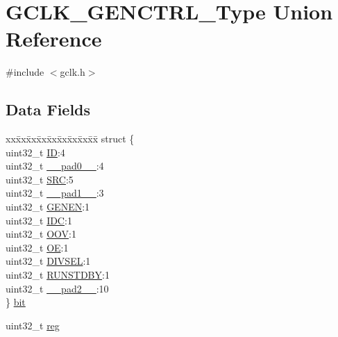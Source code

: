 \hypertarget{union_g_c_l_k___g_e_n_c_t_r_l___type}{}\section{G\+C\+L\+K\+\_\+\+G\+E\+N\+C\+T\+R\+L\+\_\+\+Type Union Reference}
\label{union_g_c_l_k___g_e_n_c_t_r_l___type}


{\ttfamily \#include $<$gclk.\+h$>$}

\subsection*{Data Fields}
\begin{DoxyCompactItemize}
\item 
\begin{tabbing}
xx\=xx\=xx\=xx\=xx\=xx\=xx\=xx\=xx\=\kill
struct \{\\
\>uint32\_t \mbox{\hyperlink{union_g_c_l_k___g_e_n_c_t_r_l___type_a505f98fde467109a9b37b3c7e008df91}{ID}}:4\\
\>uint32\_t \mbox{\hyperlink{union_g_c_l_k___g_e_n_c_t_r_l___type_a3e57c2ef1c3ffb36722f000cc1156824}{\_\_pad0\_\_}}:4\\
\>uint32\_t \mbox{\hyperlink{union_g_c_l_k___g_e_n_c_t_r_l___type_a306a1d33a25b1f2253b4b855b6e8c0d5}{SRC}}:5\\
\>uint32\_t \mbox{\hyperlink{union_g_c_l_k___g_e_n_c_t_r_l___type_a6712ba6dd1d5b43d2d56ff8ac4e275a7}{\_\_pad1\_\_}}:3\\
\>uint32\_t \mbox{\hyperlink{union_g_c_l_k___g_e_n_c_t_r_l___type_a626ef4f7972b8dfa0bb03ccbe0a5323e}{GENEN}}:1\\
\>uint32\_t \mbox{\hyperlink{union_g_c_l_k___g_e_n_c_t_r_l___type_a188040d2a2711210a32760006fecbd35}{IDC}}:1\\
\>uint32\_t \mbox{\hyperlink{union_g_c_l_k___g_e_n_c_t_r_l___type_aa77cb6d1b8627551266e155a3bf4d204}{OOV}}:1\\
\>uint32\_t \mbox{\hyperlink{union_g_c_l_k___g_e_n_c_t_r_l___type_aaabd28e260b7ff38bd76dedf0f195aba}{OE}}:1\\
\>uint32\_t \mbox{\hyperlink{union_g_c_l_k___g_e_n_c_t_r_l___type_a11c9c2929014abdf2c78a95faf49f77a}{DIVSEL}}:1\\
\>uint32\_t \mbox{\hyperlink{union_g_c_l_k___g_e_n_c_t_r_l___type_a5656560aef3eaf5aac89b68b9fe39c3a}{RUNSTDBY}}:1\\
\>uint32\_t \mbox{\hyperlink{union_g_c_l_k___g_e_n_c_t_r_l___type_a9ce12a63de64ef64ae2d59d128251cae}{\_\_pad2\_\_}}:10\\
\} \mbox{\hyperlink{union_g_c_l_k___g_e_n_c_t_r_l___type_a03ed6f66be089e517d7bba4599512149}{bit}}\\

\end{tabbing}\item 
uint32\+\_\+t \mbox{\hyperlink{union_g_c_l_k___g_e_n_c_t_r_l___type_a6b91636401516a477989a336376d7b40}{reg}}
\end{DoxyCompactItemize}


